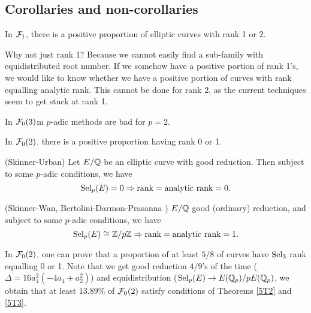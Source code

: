 \documentclass[12pt,amsfont]{amsart}
\begin{document}
\subsection{Corollaries and non-corollaries}
\begin{xmp}
In $\mathcal{F}_1$, there is a positive proportion of elliptic curves with rank 1 or 2. 
\end{xmp}

Why not just rank 1? Because we cannot easily find a sub-family with equidistributed root number. If we somehow have a positive portion of rank 1's, we would like to know whether we have a positive portion of curves with rank equalling analytic rank. This cannot be done for rank 2, as the current techniques seem to get stuck at rank 1. 

\begin{xmp} In $\mathcal{F}_0(3)$m $p$-adic methods are bad for $p = 2$. 
\end{xmp}

\begin{xmp} In $\mathcal{F}_0(2)$, there is a positive proportion having rank 0 or 1.
\end{xmp}

\begin{thm} (Skinner-Urban) \label{5T2} Let $E/{\mathbb Q}$ be an elliptic curve with good reduction. Then subject to some $p$-adic conditions, we have
$$\displaystyle \operatorname{Sel}_p(E) = 0 \Rightarrow \text{rank} = \text{analytic rank} = 0.$$
\end{thm}

\begin{thm} (Skinner-Wan, Bertolini-Darmon-Prasanna ) \label{5T3} $E/{\mathbb Q}$ good (ordinary) reduction, and subject to some $p$-adic conditions, we have
$$\displaystyle \operatorname{Sel}_p(E) \cong {\mathbb Z}/p{\mathbb Z} \Rightarrow \text{rank} = \text{analytic rank} = 1.$$
\end{thm}

In $\mathcal{F}_0(2)$, one can prove that a proportion of at least $5/8$ of curves have $\operatorname{Sel}_3$ rank equalling 0 or 1. Note that we get good reduction $4/9$'s of the time ($\Delta = 16a_4^2(-4a_4 + a_2^2)$) and equidistribution ($\operatorname{Sel}_p(E) \rightarrow E({\mathbb Q}_p)/pE({\mathbb Q}_p)$, we obtain that at least $13.89\%$ of $\mathcal{F}_0(2)$ satisfy conditions of Theorems \ref{5T2} and \ref{5T3}. 
\renewcommand{\thesubsection}{\arabic{section}.R}
\begingroup
\renewcommand{\addcontentsline}[3]{}%
\endgroup

\newpage
\renewcommand{\thesubsection}{\arabic{section}.\arabic{subsection}}
\end{document}

